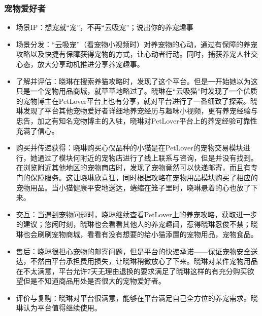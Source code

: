 \documentclass[a4paper]{ctexart}
\begin{document}
\subsubsection{宠物爱好者}
\begin{itemize}
  \item 场景IP：想宠就“宠”，不再“云吸宠”；说出你的养宠趣事
  \item 场景分发：“云吸宠”（看宠物小视频时）对养宠物的心动，通过有保障的养宠攻略以及快捷有保障获得宠物的方式，让心动者行动。同时，捕获养宠人社交心态，放大分享动机推进分享养宠趣事。
  \item 了解并评估：晓琳在搜索养猫攻略时，发现了这个平台。但是一开始她以为这只是一个宠物用品商城，就草草地略过了。晓琳在“云吸猫”时发现了一个优质的宠物博主在PetLover平台上也有分享，就对平台进行了一番细致了探索。晓琳发现了平台其他宠物爱好者详细地养宠经历与趣味小视频，更有养宠经验与忠告，加之有知名宠物博主的入驻，晓琳对PetLover平台上的养宠经验可靠性充满了信心。
  \item 购买并传递获得：晓琳购买心仪品种的小猫是在PetLover的宠物交易模块进行，她通过了模块何附近的宠物店进行了线上联系与咨询，但是并没有找到。在浏览附近其他地区的宠物商店时，发现了宠物竟然可以快递邮寄，而且有专门的保障服务。这让晓琳欣喜狂，同时根据攻略在宠物用品模块购买了相应的宠物用品。当小猫健康平安地送达，蜷缩在笼子里时，晓琳悬着的心也放了下来。
  \item 交互：当遇到宠物问题时，晓琳继续查看PetLover上的养宠攻略，获取进一步的建议；悠闲时刻，晓琳也会看看其他人的养宠趣闻，惹得晓琳忍俊不禁；晓琳也会刷刷宠物商城，看看有没有想要的给小猫添置的宠物用品，宠物食品。
  \item 售后：晓琳很担心宠物的邮寄问题，但是平台的快递承诺——保证宠物安全送达，不然由平台承担费用损失，让晓琳稍微放心了下来。晓琳对某件宠物用品在不太满意，平台允许7天无理由退换的要求满足了晓琳这样的有充分购买欲望但是不知道商品用处是否很大的宠物爱好者。
  \item 评价与复购：晓琳对平台很满意，能够在平台满足自己全方位的养宠需求。晓琳认为平台值得继续使用。
\end{itemize}
\end{document}
